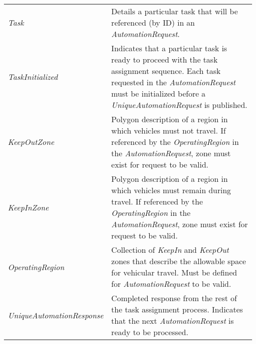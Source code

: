 \begin{longtable}[c]{@{}ll@{}}
\begin{minipage}[t]{0.29\columnwidth}
\emph{Task}
\strut\end{minipage} &
\begin{minipage}[t]{0.65\columnwidth}\raggedright\strut
Details a particular task that will be referenced (by ID) in an
\emph{AutomationRequest}.
\strut\end{minipage}\tabularnewline
\begin{minipage}[t]{0.29\columnwidth}\raggedright\strut
\emph{TaskInitialized}
\strut\end{minipage} &
\begin{minipage}[t]{0.65\columnwidth}\raggedright\strut
Indicates that a particular task is ready to proceed with the task
assignment sequence. Each task requested in the \emph{AutomationRequest}
must be initialized before a \emph{UniqueAutomationRequest} is
published.
\strut\end{minipage}\tabularnewline
\begin{minipage}[t]{0.29\columnwidth}\raggedright\strut
\emph{KeepOutZone}
\strut\end{minipage} &
\begin{minipage}[t]{0.65\columnwidth}\raggedright\strut
Polygon description of a region in which vehicles must not travel. If
referenced by the \emph{OperatingRegion} in the
\emph{AutomationRequest}, zone must exist for request to be valid.
\strut\end{minipage}\tabularnewline
\begin{minipage}[t]{0.29\columnwidth}\raggedright\strut
\emph{KeepInZone}
\strut\end{minipage} &
\begin{minipage}[t]{0.65\columnwidth}\raggedright\strut
Polygon description of a region in which vehicles must remain during
travel. If referenced by the \emph{OperatingRegion} in the
\emph{AutomationRequest}, zone must exist for request to be valid.
\strut\end{minipage}\tabularnewline
\begin{minipage}[t]{0.29\columnwidth}\raggedright\strut
\emph{OperatingRegion}
\strut\end{minipage} &
\begin{minipage}[t]{0.65\columnwidth}\raggedright\strut
Collection of \emph{KeepIn} and \emph{KeepOut} zones that describe the
allowable space for vehicular travel. Must be defined for
\emph{AutomationRequest} to be valid.
\strut\end{minipage}\tabularnewline
\begin{minipage}[t]{0.29\columnwidth}\raggedright\strut
\emph{UniqueAutomationResponse}
\strut\end{minipage} &
\begin{minipage}[t]{0.65\columnwidth}\raggedright\strut
Completed response from the rest of the task assignment process.
Indicates that the next \emph{AutomationRequest} is ready to be
processed.
\strut\end{minipage}\tabularnewline
\bottomrule
\end{longtable}

